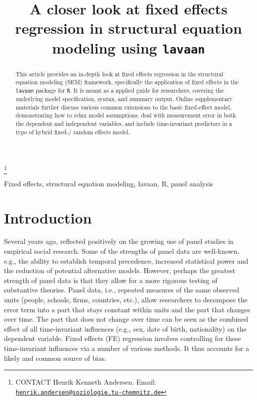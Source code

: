 \documentclass[]{interact}
\theoremstyle{plain}%
\theoremstyle{definition}
\theoremstyle{remark}
\begin{document}
\articletype{}

\title{A closer look at fixed effects regression in structural equation
modeling using \texttt{lavaan}}


\author{
}

\thanks{CONTACT Henrik Kenneth
Andersen. Email: \href{mailto:henrik.andersen@soziologie.tu-chemnitz.de}{\nolinkurl{henrik.andersen@soziologie.tu-chemnitz.de}}}

\maketitle

\begin{abstract}
This article provides an in-depth look at fixed effects regression in
the structural equation modeling (SEM) framework, specifically the
application of fixed effects in the \texttt{lavaan} package for
\texttt{R}. It is meant as a applied guide for researchers, covering the
underlying model specification, syntax, and summary output. Online
supplementary materials further discuss various common extensions to the
basic fixed-effect model, demonstrating how to relax model assumptions,
deal with measurement error in both the dependent and independent
variables, and include time-invariant predictors in a type of hybrid
fixed-/ random effects model.
\end{abstract}

\begin{keywords}
Fixed effects, structural equation modeling, lavaan, R, panel analysis
\end{keywords}

\newpage

\setcounter{page}{1}

\doublespacing

\hypertarget{intro}{%
\section{Introduction}\label{intro}}

Several years ago, \citet{Curran2011} reflected positively on the
growing use of panel studies in empirical social research. Some of the
strengths of panel data are well-known, e.g., the ability to establish
temporal precedence, increased statistical power and the reduction of
potential alternative models. However, perhaps the greatest strength of
panel data is that they allow for a more rigorous testing of substantive
theories. Panel data, i.e., repeated measures of the same observed units
(people, schools, firms, countries, etc.), allow researchers to
decompose the error term into a part that stays constant within units
and the part that changes over time. The part that does not change over
time can be seen as the combined effect of all time-invariant influences
(e.g., sex, date of birth, nationality) on the dependent variable. Fixed
effects (FE) regression involves controlling for these time-invariant
influences via a number of various methods. It thus accounts for a
likely and common source of bias.
\end{document}
